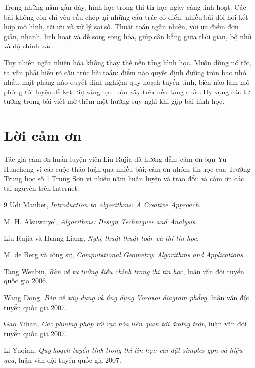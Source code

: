 \documentclass[11pt]{article}
\begin{document}
Trong những năm gần đây, hình học trong thi tin học ngày càng linh hoạt. Các
bài không còn chỉ yêu cầu chép lại những cấu trúc cổ điển; nhiều bài đòi hỏi
kết hợp mô hình, tối ưu và xử lý sai số. Thuật toán ngẫu nhiên, với ưu điểm
đơn giản, nhanh, linh hoạt và dễ song song hóa, giúp cân bằng giữa thời gian,
bộ nhớ và độ chính xác.

Tuy nhiên ngẫu nhiên hóa không thay thế nền tảng hình học. Muốn dùng nó tốt,
ta vẫn phải hiểu rõ cấu trúc bài toán: điểm nào quyết định đường tròn bao nhỏ
nhất, mặt phẳng nào quyết định nghiệm quy hoạch tuyến tính, biên nào làm mô
phỏng tôi luyện dễ kẹt. Sự sáng tạo luôn xây trên nền tảng chắc. Hy vọng các
tư tưởng trong bài viết mở thêm một hướng suy nghĩ khi gặp bài hình học.

\section*{Lời cảm ơn}

Tác giả cảm ơn huấn luyện viên Liu Rujia đã hướng dẫn; cảm ơn bạn Yu Huacheng
vì các cuộc thảo luận qua nhiều bài; cảm ơn nhóm tin học của Trường Trung học
số 1 Trung Sơn vì nhiều năm huấn luyện và trao đổi; và cảm ơn các tài nguyên
trên Internet.

\begin{thebibliography}{9}
Udi Manber, \textit{Introduction to Algorithms: A Creative Approach}.

M. H. Alsuwaiyel, \textit{Algorithms: Design Techniques and Analysis}.

Liu Rujia và Huang Liang, \textit{Nghệ thuật thuật toán và thi tin học}.

M. de Berg và cộng sự, \textit{Computational Geometry: Algorithms and Applications}.

Tang Wenbin, \textit{Bàn về tư tưởng điều chỉnh trong thi tin học}, luận văn
đội tuyển quốc gia 2006.

Wang Dong, \textit{Bàn về xây dựng và ứng dụng Voronoi diagram phẳng}, luận
văn đội tuyển quốc gia 2007.

Gao Yihan, \textit{Các phương pháp rời rạc hóa liên quan tới đường tròn}, luận
văn đội tuyển quốc gia 2007.

Li Yuqian, \textit{Quy hoạch tuyến tính trong thi tin học: cài đặt simplex gọn
và hiệu quả}, luận văn đội tuyển quốc gia 2007.
\end{thebibliography}
\end{document}
